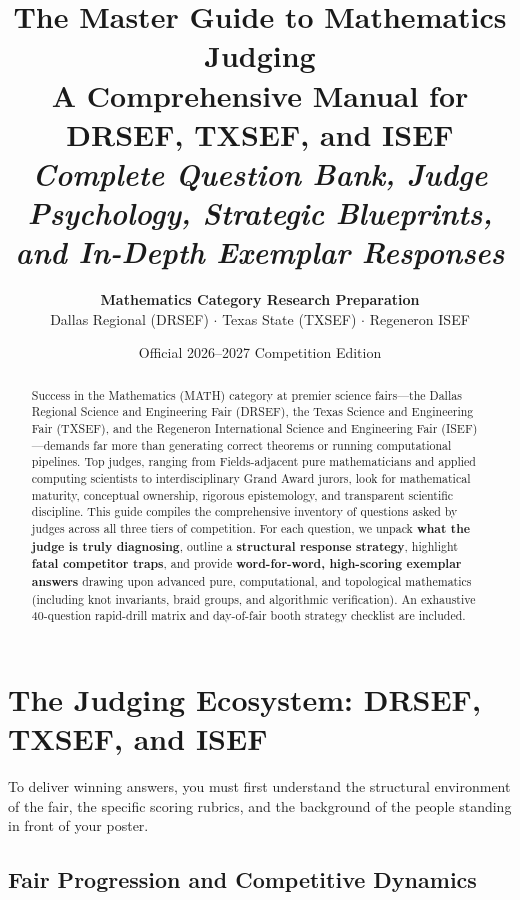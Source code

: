 \documentclass[11pt,letterpaper]{article}
\title{\Huge \textbf{\color{primaryblue}The Master Guide to Mathematics Judging}\\
\LARGE \textbf{\color{darkslate}A Comprehensive Manual for DRSEF, TXSEF, and ISEF}\\
\large \textit{Complete Question Bank, Judge Psychology, Strategic Blueprints, and In-Depth Exemplar Responses}}
\author{\textbf{Mathematics Category Research Preparation} \\ Dallas Regional (DRSEF) $\cdot$ Texas State (TXSEF) $\cdot$ Regeneron ISEF}
\date{Official 2026--2027 Competition Edition}
\begin{document}
\maketitle

\begin{abstract}
\noindent Success in the Mathematics (MATH) category at premier science fairs---the Dallas Regional Science and Engineering Fair (DRSEF), the Texas Science and Engineering Fair (TXSEF), and the Regeneron International Science and Engineering Fair (ISEF)---demands far more than generating correct theorems or running computational pipelines. Top judges, ranging from Fields-adjacent pure mathematicians and applied computing scientists to interdisciplinary Grand Award jurors, look for mathematical maturity, conceptual ownership, rigorous epistemology, and transparent scientific discipline. This guide compiles the comprehensive inventory of questions asked by judges across all three tiers of competition. For each question, we unpack \textbf{what the judge is truly diagnosing}, outline a \textbf{structural response strategy}, highlight \textbf{fatal competitor traps}, and provide \textbf{word-for-word, high-scoring exemplar answers} drawing upon advanced pure, computational, and topological mathematics (including knot invariants, braid groups, and algorithmic verification). An exhaustive 40-question rapid-drill matrix and day-of-fair booth strategy checklist are included.
\end{abstract}

\vspace{0.5em}
\tableofcontents
\newpage

\section{The Judging Ecosystem: DRSEF, TXSEF, and ISEF}

To deliver winning answers, you must first understand the structural environment of the fair, the specific scoring rubrics, and the background of the people standing in front of your poster.

\subsection{Fair Progression and Competitive Dynamics}
\end{document}
